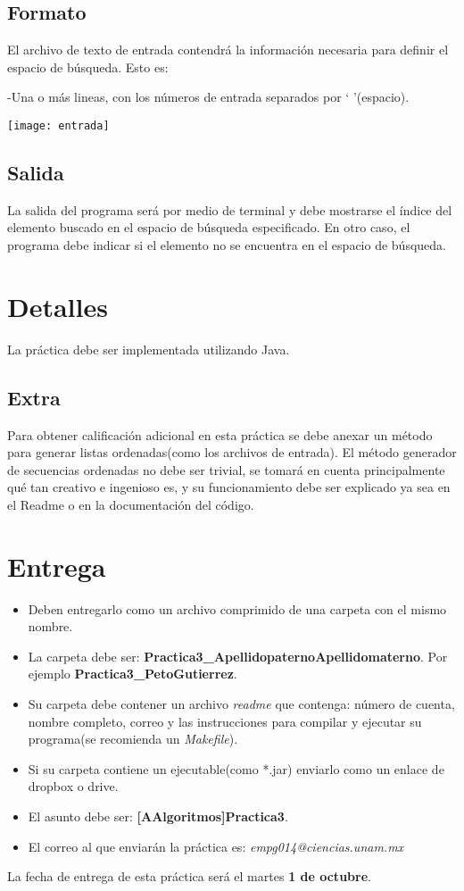 \documentclass{article}
\begin{document}
\subsection{Formato}

El archivo de texto de entrada contendrá la información necesaria para definir
el espacio de búsqueda. Esto es:

-Una o más lineas, con los números de entrada separados por ` '(espacio).

\texttt{[image: entrada]}

\subsection{Salida}

La salida del programa será por medio de terminal y debe mostrarse el índice del elemento buscado en el espacio de búsqueda especificado. En otro caso, el programa debe indicar si el elemento no se encuentra en el espacio de búsqueda.

\section{Detalles}

La práctica debe ser implementada utilizando Java.

\subsection{Extra}

Para obtener calificación adicional en esta práctica se debe anexar un método
para generar listas ordenadas(como los archivos de entrada). El método generador de secuencias ordenadas no debe ser trivial, se tomará en cuenta principalmente qué tan creativo e ingenioso es, y su funcionamiento debe ser explicado ya sea en el Readme o en la documentación del código.


\section{Entrega}

\begin{itemize}
\item Deben entregarlo como un archivo comprimido de una carpeta con el mismo nombre.
\item La carpeta debe ser: \textbf{Practica3\_ApellidopaternoApellidomaterno}. Por ejemplo \textbf{Practica3\_PetoGutierrez}.
\item Su carpeta debe contener un archivo \emph{readme} que contenga: número de cuenta, nombre completo, 
correo y las instrucciones para compilar y ejecutar su programa(se recomienda un \emph{Makefile}).
\item Si su carpeta contiene un ejecutable(como *.jar) enviarlo como un enlace de dropbox o drive.
\item El asunto debe ser: \textbf{[AAlgoritmos]Practica3}.
\item El correo al que enviarán la práctica es: \emph{empg014@ciencias.unam.mx}
\end{itemize}

La fecha de entrega de esta práctica será el martes \textbf{1 de octubre}.
\end{document}
